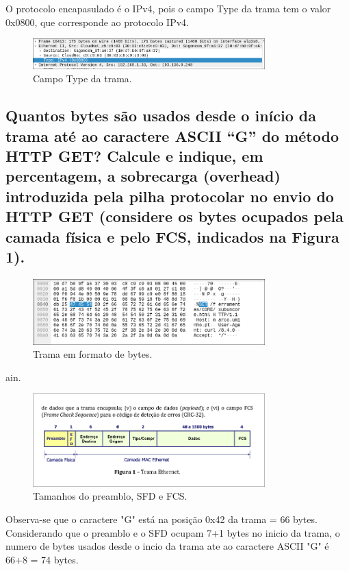 \documentclass{article}
\begin{document}
O protocolo encapasulado é o IPv4, pois o campo Type da trama tem o valor 0x0800, que corresponde ao protocolo IPv4.

\begin{figure}[h]
    \centering
    \includegraphics[width=0.8\textwidth]{images/type.png}
    \caption{\label{fig:type}Campo Type da trama.}
\end{figure}

\subsection{Quantos bytes são usados desde o início da trama até ao caractere ASCII “G” do
método HTTP GET? Calcule e indique, em percentagem, a sobrecarga (overhead)
introduzida pela pilha protocolar no envio do HTTP GET (considere os bytes
ocupados pela camada física e pelo FCS, indicados na Figura 1).}

\begin{figure}[h]
    \centering
    \includegraphics[width=0.8\textwidth]{images/byte.png}
    \caption{\label{fig:byte}Trama em formato de bytes.}
\end{figure}
ain.
\begin{figure}[h]
    \centering
    \includegraphics[width=0.8\textwidth]{images/fcs.png}
    \caption{\label{fig:fcs}Tamanhos do preamblo, SFD e FCS.}
\end{figure}

Observa-se que o caractere "G" está na posição 0x42 da trama = 66 bytes. Considerando que o preamblo e o SFD ocupam 7+1 bytes no inicio da trama, o numero de bytes usados desde o incio da trama ate ao caractere ASCII "G" é 66+8 = 74 bytes.
\end{document}

